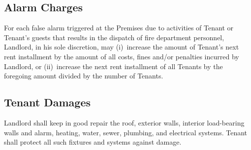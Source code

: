 \documentclass{article}
\begin{document}
\subsection{Alarm Charges}
For each false alarm triggered at the Premises due to activities of Tenant or
Tenant’s guests that results in the dispatch of fire department personnel,
Landlord, in his sole discretion, may (i)~increase the amount of Tenant’s next
rent installment by the amount of all costs, fines and/or penalties incurred by
Landlord, or (ii)~increase the next rent installment of all Tenants by the
foregoing amount divided by the number of Tenants.

\subsection{Tenant Damages}
Landlord shall keep in good repair the roof, exterior walls, interior
load-bearing walls and alarm, heating, water, sewer, plumbing, and electrical
systems. Tenant shall protect all such fixtures and systems against damage.
\end{document}
